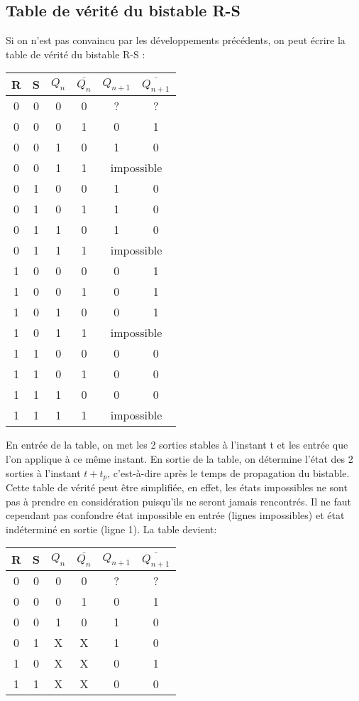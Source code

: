 \documentclass[11pt,a4paper]{article}
\theoremstyle{definition}%
\begin{document}
\subsection{Table de vérité du bistable R-S}
Si on n'est pas convaincu par les développements précédents, on peut écrire la table de vérité du
bistable R-S :

\begin{center}
\begin{tabular}{cccc|cc}
R & S & $Q_n$ & $\overline{Q_n}$ & $Q_{n+1}$ & $\overline{Q_{n+1}}$ \\ 
\hline 
0 & 0 & 0 & 0 & ? & ? \\ 
0 & 0 & 0 & 1 & 0 & 1 \\ 	
0 & 0 & 1 & 0 & 1 & 0 \\ 	
0 & 0 & 1 & 1 &  \multicolumn{2}{c}{impossible} \\ 	
0 & 1 & 0 & 0 & 1 & 0 \\ 	
0 & 1 & 0 & 1 & 1 & 0 \\ 
0 & 1 & 1 & 0 & 1 & 0 \\ 	
0 & 1 & 1 & 1 & \multicolumn{2}{c}{impossible}  \\ 	
1 & 0 & 0 & 0 & 0 & 1 \\ 	
1 & 0 & 0 & 1 & 0 & 1 \\ 
1 & 0 & 1 & 0 & 0 & 1 \\ 	
1 & 0 & 1 & 1 & \multicolumn{2}{c}{impossible}  \\ 	
1 & 1 & 0 & 0 & 0 & 0 \\ 	
1 & 1 & 0 & 1 & 0 & 0 \\ 
1 & 1 & 1 & 0 & 0 & 0 \\ 	
1 & 1 & 1 & 1 & \multicolumn{2}{c}{impossible}  \\ 	
\end{tabular} 
\end{center}

En entrée de la table, on met les 2 sorties stables à l'instant t et les entrée que l'on applique à ce
même instant. En sortie de la table, on détermine l'état des 2 sorties à l'instant $t+t_p$, c'est-à-dire après le
temps de propagation du bistable.
Cette table de vérité peut être simplifiée, en effet, les états impossibles ne sont pas à prendre en
considération puisqu'ils ne seront jamais rencontrés. Il ne faut cependant pas confondre état
impossible en entrée (lignes impossibles) et état indéterminé en sortie (ligne 1). La table devient:


\begin{center}
\begin{tabular}{cccc|cc}
R & S & $Q_n$ & $\overline{Q_n}$ & $Q_{n+1}$ & $\overline{Q_{n+1}}$ \\ 
\hline
0 & 0 & 0 & 0 & ? & ? \\ 
0 & 0 & 0 & 1 & 0 & 1 \\ 	
0 & 0 & 1 & 0 & 1 & 0 \\ 	
0 & 1 & X & X & 1 & 0 \\ 	
1 & 0 & X & X & 0 & 1 \\ 	
1 & 1 & X & X & 0 & 0 \\ 	 	
\end{tabular} 
\end{center}
\end{document}
